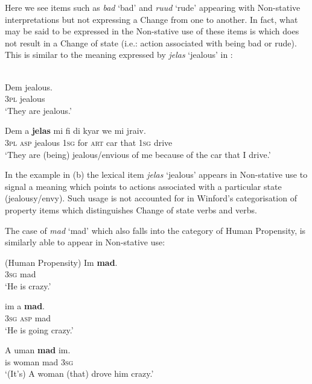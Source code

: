 Here we see items such as \textit{bad} `bad' and \textit{ruud} `rude'
appearing with Non-stative interpretations but not expressing a Change
from one  to another.  In fact, what may be said to be expressed
in the Non-stative use of these items is  which does not result
in a Change of state (i.e.: action associated with being bad or rude).
This is similar to the meaning expressed by \textit{jelas} `jealous'
in :\pagebreak

 
\ea%
\label{ex:3:30}
\\
\ea
\gll Dem jealous.\\
\textsc{3pl} jealous              \\
\glt `They are jealous.'

\ex
\gll    Dem          a \textbf{jelas}         mi   fi            di   kyar   we            mi jraiv.\\
\textsc{3pl} \textsc{asp}     jealous \textsc{1sg} for \textsc{art}    car   that \textsc{1sg} drive  \\

\glt `They are (being) jealous\slash envious of me because of the car that I drive.' \z \z

In the example in (b) the lexical item \textit{jelas} ‘jealous’
appears in Non-stative use to signal a meaning which points to actions
associated with a particular state (jealousy\slash envy).  Such usage is not
accounted for in Winford’s categorisation of property items which
distinguishes Change of state verbs and  verbs.

The case of \textit{mad} `mad’ which also falls into the category of
Human Propensity, is similarly able to appear in Non-stative use:

\ea%
\label{ex:3:31}
(Human Propensity) \ea
  \gll Im \textbf{mad}.\\
\textsc{3sg} mad          \\
\glt `He is crazy.'

\ex
 \gll  im           a \textbf{mad}.\\
\textsc{3sg} \textsc{asp}      mad        \\
\glt `He is going crazy.'

\ex
\gll A uman \textbf{mad}        im.\\
	is woman        mad \textsc{3sg}    \\
\glt `(It’s) A woman (that) drove him crazy.' \z \z

